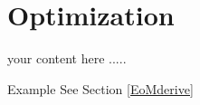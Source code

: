 
\chapter{Optimization} %

\label{Chapter4} %


your content here .....

Example
See Section \ref{EoMderive}
